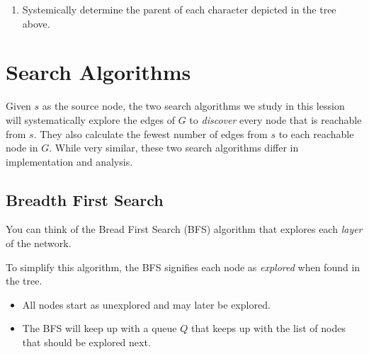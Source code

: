\documentclass[12pt]{article}
\theoremstyle{definition}
\begin{document}
\begin{enumerate}
	
\item Systemically determine the parent of each character depicted in the tree above.
\end{enumerate}
\vfill
\newpage







\section{Search Algorithms}

Given $s$ as the source node, the two search algorithms we study in this lession will systematically explore the edges of $G$ to \emph{discover} every node that is reachable from $s$. They also calculate the fewest number of edges from $s$ to each reachable node in $G$. While very similar, these two search algorithms differ in implementation and analysis.

\subsection{Breadth First Search}

You can think of the Bread First Search (BFS) algorithm that explores each \emph{layer} of the network.

To simplify this algorithm, the BFS signifies each node as \emph{explored} when found in the tree. 

\begin{itemize}
\item All nodes start as unexplored and may later be explored. 
\item The BFS will keep up with a queue $Q$ that keeps up with the list of nodes that should be explored next.
\end{itemize}
\end{document}
